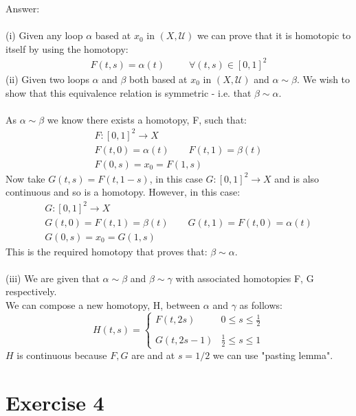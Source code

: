 \documentclass[12pt]{article}
\begin{document}
\vspace{1cm}
\noindent
Answer:\\
\\
(i) Given any loop $\alpha$ based at $x_0$ in $(X, \mathcal{U})$ we can prove that it is homotopic to itself by using the homotopy:
\begin{align*}
    F(t,s) = \alpha(t) \;\;\;\;\;\;\;\;\; \forall (t,s) \in [0,1]^2
\end{align*}
(ii) Given two loops $\alpha$ and $\beta$ both based at $x_0$ in $(X, \mathcal{U})$ and $\alpha \sim \beta$.  We wish to show that this equivalence relation is symmetric - i.e.
that $\beta \sim \alpha$.\\
\\
As $\alpha \sim \beta$ we know there exists a homotopy, F, such that:
\[
\begin{gathered}
F\colon [0,1]^2 \to X \\
F(t,0) =\alpha(t) \qquad F(t,1)=\beta(t) \\
F(0,s) = x_0 = F(1,s)
\end{gathered}
\]
Now take $G(t,s)=F(t,1-s)$, in this case $G:[0,1]^2 \to X$ and is also continuous and so is a homotopy.
However, in this case:
\[
\begin{gathered}
G\colon [0,1]^2 \to X \\
G(t,0) =F(t,1)=\beta(t) \qquad G(t,1)=F(t,0)=\alpha(t) \\
G(0,s) = x_0 = G(1,s)
\end{gathered}
\]
This is the required homotopy that proves that: $\beta \sim \alpha$.\\
\\
(iii) We are given that $\alpha \sim \beta$ and $\beta \sim \gamma$ with associated homotopies F, G respectively.\\
We can compose a new homotopy, H, between $\alpha$ and $\gamma$ as follows:
\begin{equation*}
H(t,s)=
\left\{
\begin{array}{ll}
F(t,2s) & 0 \le s \le \frac{1}{2} \\[4pt]
       &      \\[4pt]
G(t,2s-1) & \frac{1}{2} \le s \le 1
\end{array}
\right.
\end{equation*}
$H$ is continuous because $F,G$ are and at $s=1/2$ we can use "pasting lemma".

\newpage

\section*{Exercise 4}
\end{document}

